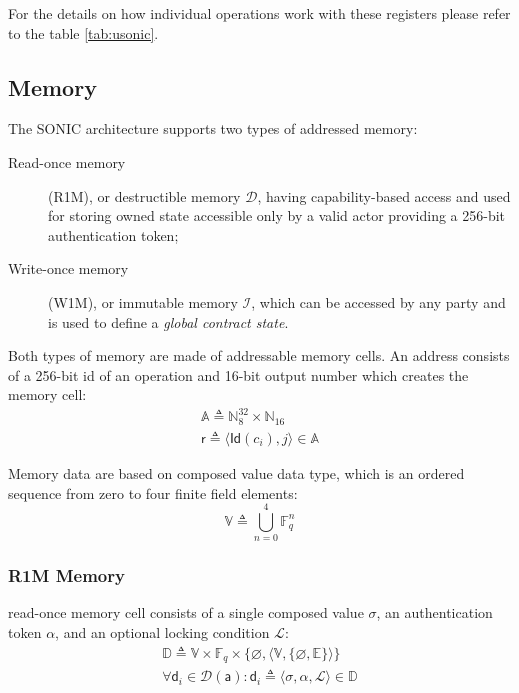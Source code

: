 \documentclass[9pt,oneside]{amsart}
\begin{document}
\begin{multicols}{2}
For the details on how individual operations work with these registers
please refer to the table \ref{tab:usonic}.

\subsection{Memory}\label{Memory}

The SONIC architecture supports two types of addressed memory:
\begin{description}
\item[Read-once memory] (R1M), or \gls{destructible memory} $\mathcal{D}$,
    having capability-based access and used for storing \gls{owned state}
    accessible only by a valid actor providing a 256-bit \gls{authentication token};

\item[Write-once memory] (W1M), or \gls{immutable memory} $\mathcal{I}$,
    which can be accessed by any party and is used to define a \emph{global contract state}.
\end{description}

Both types of memory are made of addressable memory cells.
An address consists of a 256-bit id of an operation and 16-bit output number
which creates the memory cell:
\noindent
\begin{gather}
\mathbb{A} \triangleq \mathbb{N}^{32}_8 \times \mathbb{N}_{16} \\
\mathsf{r} \triangleq \langle \mathsf{Id}(c_i), j \rangle \in \mathbb{A}
\end{gather}

Memory data are based on \gls{composed value} data type,
which is an ordered sequence from zero to four finite field elements:
\noindent
\begin{equation}
\mathbb{V} \triangleq \bigcup_{n=0}^{4} \mathbb{F}_q^n
\end{equation}

\subsubsection{R1M Memory}\label{R1M}

\Gls{read-once memory} cell consists of a single \gls{composed value} $\sigma$,
an \gls{authentication token} $\alpha$, and an optional \gls{locking condition} $\mathcal{L}$:
\noindent
\begin{gather}
\mathbb{D} \triangleq \mathbb{V} \times \mathbb{F}_q \times \{ \varnothing, \langle \mathbb{V}, \{ \varnothing, \mathbb{E} \} \rangle \} \\
\forall \mathsf{d}_i \in \mathcal{D}(\mathsf{a}) : \mathsf{d}_i \triangleq \langle \sigma, \alpha, \mathcal{L} \rangle \in \mathbb{D}
\end{gather}


\end{multicols}
\end{document}
